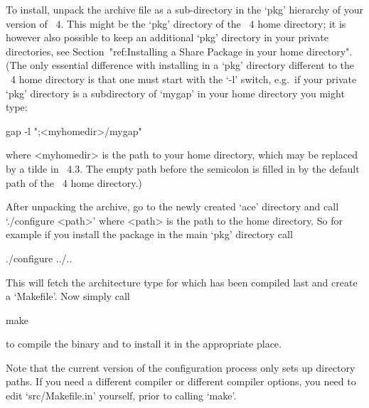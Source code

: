 


To install, unpack the archive file as a sub-directory  in  the  `pkg'
hierarchy of your  version  of  {\GAP}~4.  This  might  be  the  `pkg'
directory of the {\GAP}~4 home directory; it is however also  possible
to keep an additional `pkg' directory in your private directories, see
Section~"ref:Installing a Share Package in your home directory".  (The
only essential difference with installing {\ACE} in a `pkg'  directory
different to the {\GAP}~4 home directory is that one must start {\GAP}
with the `-l' switch,  e.g.~if  your  private  `pkg'  directory  is  a
subdirectory of `mygap' in your home directory you might type:

gap -l ";<myhomedir>/mygap"

where <myhomedir> is the path to your home  directory,  which  may  be
replaced by a tilde in {\GAP}~4.3. The empty path before the semicolon
is filled in by the default path of the {\GAP}~4 home directory.)

After unpacking the archive, go to the newly  created  `ace'
directory and call `./configure <path>' where <path> is  the  path  to
the {\GAP} home directory. So for example if you install  the  package
in the main `pkg' directory call

\begintt
./configure ../..
\endtt

This  will fetch  the  architecture  type for  which  {\GAP} has  been
compiled last and create a `Makefile'. Now simply call

\begintt
make
\endtt

to compile the binary and to install it in the appropriate place.

Note that the  current version of the configuration  process only sets
up  directory paths.  If you  need a  different compiler  or different
compiler options, you need to edit `src/Makefile.in'  yourself,  prior
to calling `make'.

